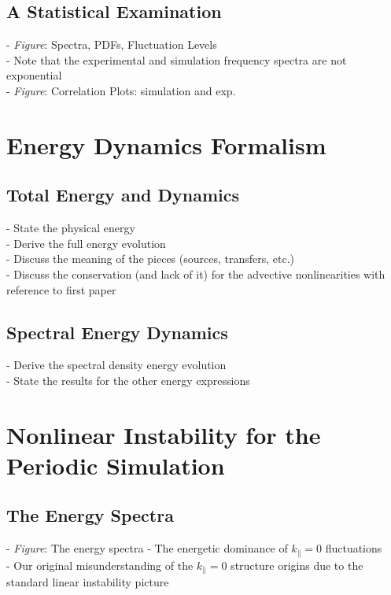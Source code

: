 \documentclass[12pt]{article}
\begin{document}
\subsection{A Statistical Examination}

- \emph{Figure}: Spectra, PDFs, Fluctuation Levels \\
- Note that the experimental and simulation frequency spectra are not exponential \\
- \emph{Figure}: Correlation Plots: simulation and exp. \\


\section{Energy Dynamics Formalism}

\subsection{Total Energy and Dynamics}

- State the physical energy \\
- Derive the full energy evolution \\
- Discuss the meaning of the pieces (sources, transfers, etc.) \\
- Discuss the conservation (and lack of it) for the advective nonlinearities with reference to first paper \\

\subsection{Spectral Energy Dynamics}

- Derive the spectral density energy evolution \\
- State the results for the other energy expressions \\

\section{Nonlinear Instability for the Periodic Simulation}

\subsection{The Energy Spectra}

- \emph{Figure}: The energy spectra
- The energetic dominance of $k_\parallel = 0$ fluctuations \\
- Our original misunderstanding of the $k_\parallel = 0$ structure origins due to the standard linear instability picture \\
\end{document}
